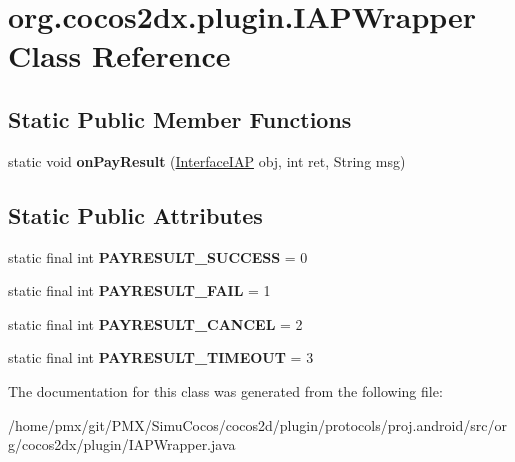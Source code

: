 \hypertarget{classorg_1_1cocos2dx_1_1plugin_1_1IAPWrapper}{}\section{org.\+cocos2dx.\+plugin.\+I\+A\+P\+Wrapper Class Reference}
\label{classorg_1_1cocos2dx_1_1plugin_1_1IAPWrapper}
\subsection*{Static Public Member Functions}
\begin{DoxyCompactItemize}
\item 
\mbox{\label{classorg_1_1cocos2dx_1_1plugin_1_1IAPWrapper_a5ae0b5aa01d9a550244dafaf4182910c}} 
static void {\bfseries on\+Pay\+Result} (\hyperlink{interfaceorg_1_1cocos2dx_1_1plugin_1_1InterfaceIAP}{Interface\+I\+AP} obj, int ret, String msg)
\end{DoxyCompactItemize}
\subsection*{Static Public Attributes}
\begin{DoxyCompactItemize}
\item 
\mbox{\label{classorg_1_1cocos2dx_1_1plugin_1_1IAPWrapper_a1a3b524a254b938b784bf5766bdc26e5}} 
static final int {\bfseries P\+A\+Y\+R\+E\+S\+U\+L\+T\+\_\+\+S\+U\+C\+C\+E\+SS} = 0
\item 
\mbox{\label{classorg_1_1cocos2dx_1_1plugin_1_1IAPWrapper_ac2dd048f1551c507ac5fc97801e47f5e}} 
static final int {\bfseries P\+A\+Y\+R\+E\+S\+U\+L\+T\+\_\+\+F\+A\+IL} = 1
\item 
\mbox{\label{classorg_1_1cocos2dx_1_1plugin_1_1IAPWrapper_af0e2880573337a6ccd47e09235e09679}} 
static final int {\bfseries P\+A\+Y\+R\+E\+S\+U\+L\+T\+\_\+\+C\+A\+N\+C\+EL} = 2
\item 
\mbox{\label{classorg_1_1cocos2dx_1_1plugin_1_1IAPWrapper_a6634acb06011e450c8c9d85eff53b8dd}} 
static final int {\bfseries P\+A\+Y\+R\+E\+S\+U\+L\+T\+\_\+\+T\+I\+M\+E\+O\+UT} = 3
\end{DoxyCompactItemize}


The documentation for this class was generated from the following file\+:\begin{DoxyCompactItemize}
\item 
/home/pmx/git/\+P\+M\+X/\+Simu\+Cocos/cocos2d/plugin/protocols/proj.\+android/src/org/cocos2dx/plugin/I\+A\+P\+Wrapper.\+java\end{DoxyCompactItemize}

